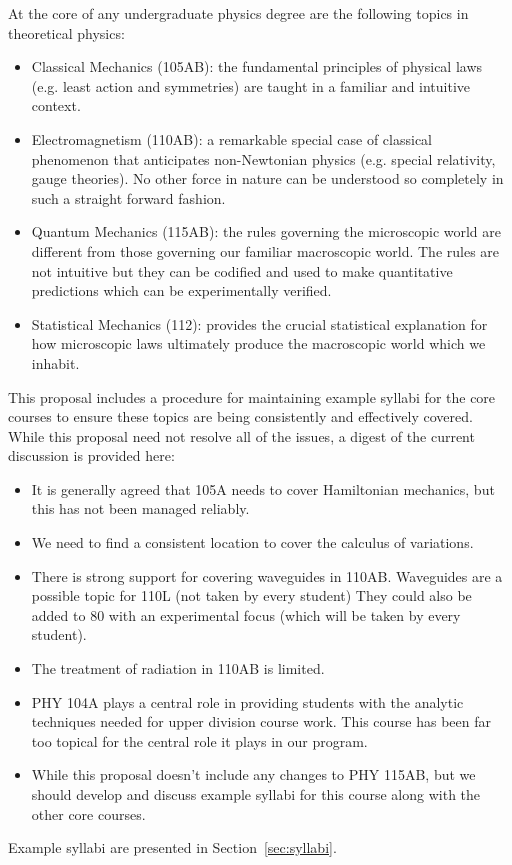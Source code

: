 \documentclass[12pt]{article}
\begin{document}
At the core of any undergraduate physics degree are the following
topics in theoretical physics:
\begin{itemize}
\item Classical Mechanics (105AB): the fundamental principles of physical laws
  (e.g. least action and symmetries) are taught in a familiar and
  intuitive context. 
\item Electromagnetism (110AB): a remarkable special case of classical
  phenomenon that anticipates non-Newtonian physics (e.g. special
  relativity, gauge theories).  No other force in nature can be understood so
  completely in such a straight forward fashion.  
\item Quantum Mechanics (115AB): the rules governing the microscopic world are
  different from those governing our familiar macroscopic world.  The
  rules are not intuitive but they can be codified and used to make
  quantitative predictions which can be experimentally verified.
\item Statistical Mechanics (112): provides the crucial statistical explanation for how
  microscopic laws ultimately produce the macroscopic world which we inhabit.
\end{itemize}
This proposal includes a procedure for maintaining example syllabi for
the core courses to ensure these topics are being consistently and
effectively covered.  While this proposal need not resolve all of the
issues, a digest of the current discussion is provided here:
\begin{itemize}
 \item It is generally agreed that 105A needs to cover Hamiltonian mechanics, but this has not been managed reliably.
 \item We need to find a consistent location to cover the calculus of variations.
 \item There is strong support for covering waveguides in 110AB.
   Waveguides are a possible topic for 110L (not taken by every
   student) They could also be added to 80 with an experimental focus
   (which will be taken by every student).
 \item The treatment of radiation in 110AB is limited.
 \item PHY 104A plays a central role in providing students with the
   analytic techniques needed for upper division course work.  This
   course has been far too topical for the central role it plays in
   our program.   
 \item While this proposal doesn't include any changes to PHY 115AB, but we should develop and discuss example syllabi for this course along with the other core courses.
\end{itemize}
Example syllabi are presented in Section~\ref{sec:syllabi}.  
\end{document}
